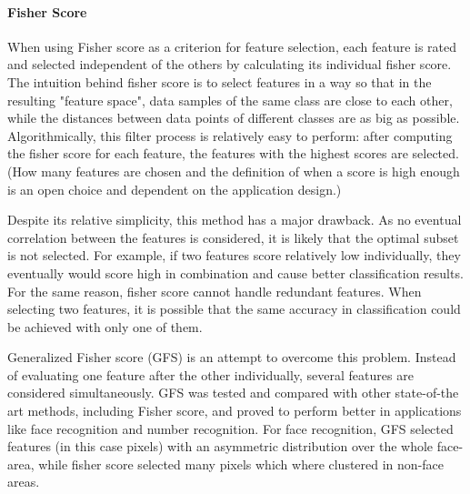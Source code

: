 \paragraph{Fisher Score}
\label{par:methods.flat.filter.fisher_score}


When using Fisher score as a criterion for feature selection, each feature is rated and selected independent of the others by calculating its individual fisher score. The intuition behind fisher score is to select features in a way so that in the resulting "feature space", data samples of the same class are close to each other, while the distances between data points of different classes are as big as possible. Algorithmically, this filter process is relatively easy to perform: after computing the fisher score for each feature, the features with the highest scores are selected. (How many features are chosen and the definition of when a score is high enough is an open choice and dependent on the application design.)

Despite its relative simplicity, this method has a major drawback. As no eventual correlation between the features is considered, it is likely that the optimal subset is not selected. For example, if two features score relatively low individually, they eventually would score high in combination and cause better classification results. For the same reason, fisher score cannot handle redundant features. When selecting two features, it is possible that the same accuracy in classification could be achieved with only one of them.

Generalized Fisher score (GFS) is an attempt to overcome this problem. Instead of evaluating one feature after the other individually, several features are considered simultaneously. GFS was tested and compared with other state-of-the art methods, including Fisher score, and proved to perform better in applications like face recognition and number recognition. For face recognition, GFS selected features (in this case pixels) with an asymmetric distribution over the whole face-area, while fisher score selected many pixels which where clustered in non-face areas. \cite{Gu:12}
  